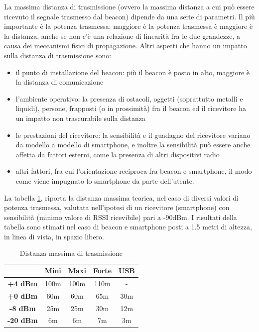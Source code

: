 La massima distanza di trasmissione (ovvero la massima distanza a cui può essere ricevuto il segnale trasmesso dal beacon) dipende da una serie di parametri. 
Il più importante è la potenza trasmessa: maggiore è la potenza trasmessa è maggiore è la distanza, anche se non c'è una relazione di linearità fra le due grandezze, a causa dei meccanismi fisici di propagazione. 
Altri aspetti che hanno un impatto sulla distanza di trasmissione sono:
\begin{itemize}
\item il punto di installazione del beacon: più il beacon è posto in alto, maggiore è la distanza di comunicazione
\item l'ambiente operativo: la presenza di ostacoli, oggetti (soprattutto metalli e liquidi), persone, frapposti (o in prossimità) fra il beacon ed il ricevitore ha un impatto non trascurabile sulla distanza
\item le prestazioni del ricevitore: la sensibilità e il guadagno del ricevitore variano da modello a modello di smartphone, e inoltre la sensibilità può essere anche affetta da fattori esterni, come la presenza di altri dispositivi radio
\item altri fattori, fra cui l'orientazione reciproca fra beacon e smartphone, il modo come viene impugnato lo smartphone da parte dell'utente.
\end{itemize}

La tabella \ref{tab:distanza}, riporta la distanza massima teorica, nel caso di diversi valori di potenza trasmessa, valutata nell'ipotesi di un ricevitore (smartphone) con sensibilità (minimo valore di RSSI ricevibile) pari a -90dBm. 
I risultati della tabella sono stimati nel caso di beacon e smartphone posti a 1.5 metri di altezza, in linea di vista, in spazio libero.
\begin{table}[htbp]
\begin{center}
\begin{tabular}{|c|c|c|c|c|}
\hline
 & Mini & Maxi & Forte & USB\\
\hline
\textbf{+4 dBm} & 100m & 100m & 110m & -\\
\hline
\textbf{+0 dBm} & 60m & 60m & 65m & 30m\\
\hline
\textbf{-8 dBm} & 25m & 25m & 30m & 12m\\
\hline
\textbf{-20 dBm} & 6m & 6m & 7m & 3m\\
\hline
\end{tabular}
\end{center}
\caption{Distanza massima di trasmissione}
\label{tab:distanza}
\end{table}
